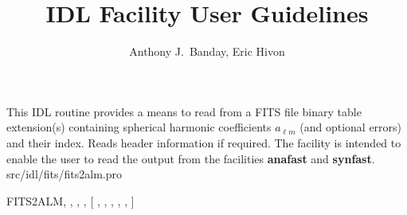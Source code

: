 



\sloppy



\title{\healpix IDL Facility User Guidelines}
 \section[fits2alm]{ }
\label{idl:fits2alm}
\author{Anthony J.~Banday, Eric Hivon}




\begin{facility}
{This IDL routine provides a means to 
read from a FITS file binary table extension(s) containing spherical
harmonic coefficients $a_{\ell m}$ (and optional errors) and their index. Reads
header information if required. The facility is intended to enable 
the user to read the output from the \healpix facilities \textbf{anafast} and \textbf{synfast}.
}
{src/idl/fits/fits2alm.pro}

\end{facility}

\begin{IDLformat}
{FITS2ALM, , 
, 
, [%
, 
, 
, 
, 
, 
 ]}
\end{IDLformat}

